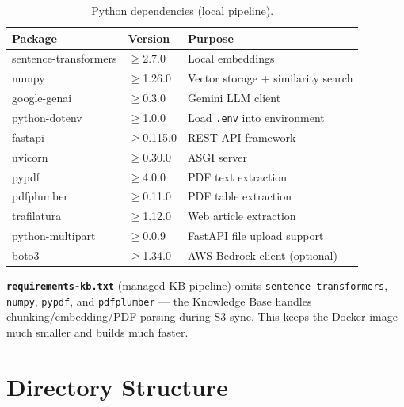 \documentclass[11pt,a4paper]{paper}
\begin{document}
\begin{table}[h]
\centering
\small
\begin{tabular}{>{\ttfamily}l >{\ttfamily}l >{\raggedright\arraybackslash}p{7.5cm}}
\toprule
\textbf{Package} & \textbf{Version} & \textbf{Purpose} \\
\midrule
sentence-transformers & $\geq$2.7.0 & Local embeddings \\
numpy & $\geq$1.26.0 & Vector storage + similarity search \\
google-genai & $\geq$0.3.0 & Gemini LLM client \\
python-dotenv & $\geq$1.0.0 & Load \texttt{.env} into environment \\
fastapi & $\geq$0.115.0 & REST API framework \\
uvicorn & $\geq$0.30.0 & ASGI server \\
pypdf & $\geq$4.0.0 & PDF text extraction \\
pdfplumber & $\geq$0.11.0 & PDF table extraction \\
trafilatura & $\geq$1.12.0 & Web article extraction \\
python-multipart & $\geq$0.0.9 & FastAPI file upload support \\
boto3 & $\geq$1.34.0 & AWS Bedrock client (optional) \\
\bottomrule
\end{tabular}
\caption{Python dependencies (local pipeline).}
\label{tab:deps}
\end{table}

\textbf{\texttt{requirements-kb.txt}} (managed KB pipeline) omits \texttt{sentence-transformers}, \texttt{numpy}, \texttt{pypdf}, and \texttt{pdfplumber} — the Knowledge Base handles chunking/embedding/PDF-parsing during S3 sync. This keeps the Docker image much smaller and builds much faster.

\section{Directory Structure}
\label{sec:directory}
\end{document}
